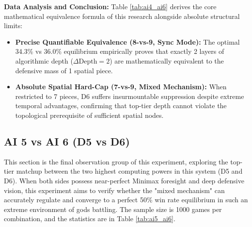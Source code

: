 \textbf{Data Analysis and Conclusion:} 
Table \ref{tab:ai4_ai6} derives the core mathematical equivalence formula of this research alongside absolute structural limits:
\begin{itemize}
    \item \textbf{Precise Quantifiable Equivalence (8-vs-9, Sync Mode):} The optimal 34.3\% vs 36.0\% equilibrium empirically proves that exactly 2 layers of algorithmic depth ($\Delta \text{Depth} = 2$) are mathematically equivalent to the defensive mass of 1 spatial piece.
    \item \textbf{Absolute Spatial Hard-Cap (7-vs-9, Mixed Mechanism):} When restricted to 7 pieces, D6 suffers insurmountable suppression despite extreme temporal advantages, confirming that top-tier depth cannot violate the topological prerequisite of sufficient spatial nodes.
\end{itemize}

\subsection{AI 5 vs AI 6 (D5 vs D6)}
\label{subsec:ai5_ai6}

This section is the final observation group of this experiment, exploring the top-tier matchup between the two highest computing powers in this system (D5 and D6). When both sides possess near-perfect Minimax foresight and deep defensive vision, this experiment aims to verify whether the "mixed mechanism" can accurately regulate and converge to a perfect 50\% win rate equilibrium in such an extreme environment of gods battling. The sample size is 1000 games per combination, and the statistics are in Table \ref{tab:ai5_ai6}.

\begin{table}[htbp]
    \centering
    \caption{AI 5 vs AI 6 Simulation Data Distribution (Sample Size=1000)}
    \label{tab:ai5_ai6}
\end{table}

